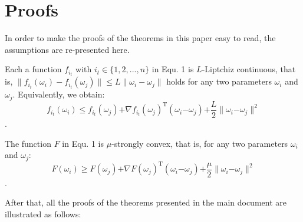 \documentclass[letterpaper]{article}
\begin{document}
\section{Proofs}
\label{sect_proofs}
In order to make the proofs of the theorems in this paper easy to read, the  assumptions are re-presented here. 



\begin{Assumption}
Each a function $f_{i_t}$ with $i_t\in\{1,2, ..., n\}$ in Equ. 1 is $L$-Liptchiz continuous, that is,  $\parallel  f_{i_t}(\omega_i) - f_{i_t}(\omega_j)  \parallel \le L \parallel \omega_i - \omega_j    \parallel$ holds for any two parameters $\omega_i$ and $\omega_j$. Equivalently, we obtain:
\label{assumption_liptchiz}
\begin{equation}
\label{equa_l_smooth} 
f_{i_t}(\omega_i)\le f_{i_t}(\omega_j)\mathrm{+}\nabla f_{i_t}(\omega_j)^\mathrm{T} (\omega_i\mathrm{-}\omega_j)\mathrm{+}\frac{L}{2}\parallel \omega_i\mathrm{-}\omega_j\parallel^2
 \end{equation}.

\end{Assumption}

\begin{Assumption}
\label{assumption_strongly_convex}
The function $F$ in Equ. 1 is $\mu$-strongly convex, that is, for any two parameters $\omega_i$ and $\omega_j$:
\begin{equation}
F(\omega_i)\ge F(\omega_j)\mathrm{+}\nabla F(\omega_j)^\mathrm{T} (\omega_i\mathrm{-}\omega_j)\mathrm{+}\frac{\mu}{2}\parallel \omega_i\mathrm{-}\omega_j\parallel^2
\end{equation}.

\end{Assumption}

After that, all the proofs of the theorems presented in the main document are illustrated as follows:
\end{document}
